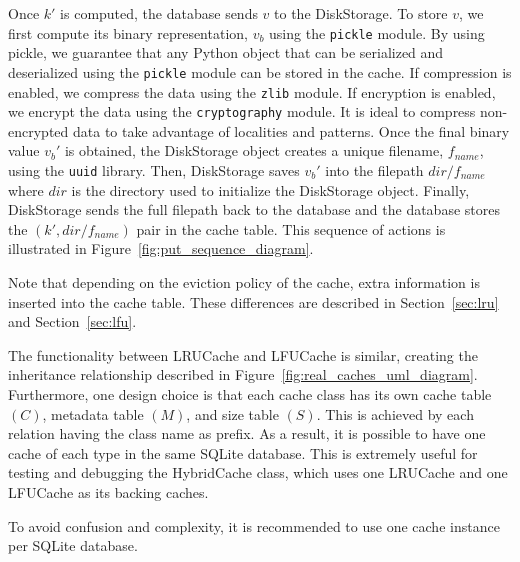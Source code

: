 Once $k'$ is computed, the database sends $v$ to the DiskStorage.
To store $v$, we first
compute its binary representation, $v_b$ using the \texttt{pickle} module.
By using pickle, we guarantee that any Python object
that can be serialized and deserialized using
the \texttt{pickle} module can be stored in the cache.
If compression is enabled, we compress the data using the \texttt{zlib} module.
If encryption is enabled, we encrypt the data using the \texttt{cryptography}
module. It is ideal to compress non-encrypted
data to take advantage of localities and patterns.
Once the final binary value $v_b'$ is obtained,
the DiskStorage object creates a unique
filename, $f_{name}$, using the \texttt{uuid} library.
Then, DiskStorage saves $v_b'$ into the filepath $dir/f_{name}$ where $dir$ is the directory
used to initialize the DiskStorage object. Finally, DiskStorage sends the full filepath
back to the database and the database stores the $(k', dir/f_{name})$ pair in the cache table.
This sequence of actions is illustrated in Figure~\ref{fig:put_sequence_diagram}.

Note that depending on the eviction policy of the cache, extra information
is inserted into the cache table. These differences are described in
Section~\ref{sec:lru} and Section~\ref{sec:lfu}.

The functionality between LRUCache and LFUCache
is similar, creating the inheritance relationship described in Figure~\ref{fig:real_caches_uml_diagram}.
Furthermore, one design choice is that each cache class has its own cache table $(C)$,
metadata table $(M)$, and size table $(S)$.
This is achieved by each relation having the class name as prefix.
As a result, it is possible to have
one cache of each type in the same SQLite database. This is extremely useful
for testing and debugging the HybridCache class,
which uses one LRUCache and one LFUCache
as its backing caches.

\begin{tcolorbox}[colback=blue!5!white, colframe=blue!75!black, title=Note]
    To avoid confusion and complexity, it is recommended to use
    one cache instance per SQLite database.
\end{tcolorbox}

